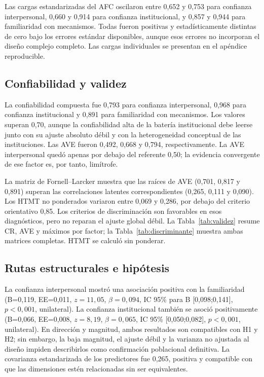 \documentclass[11pt,letterpaper]{article}
\begin{document}
Las cargas estandarizadas del AFC oscilaron entre 0{,}652 y 0{,}753 para confianza interpersonal, 0{,}660 y 0{,}914 para confianza institucional, y 0{,}857 y 0{,}944 para familiaridad con mecanismos. Todas fueron positivas y estadísticamente distintas de cero bajo los errores estándar disponibles, aunque esos errores no incorporan el diseño complejo completo. Las cargas individuales se presentan en el apéndice reproducible.

\subsection{Confiabilidad y validez}

La confiabilidad compuesta fue 0{,}793 para confianza interpersonal, 0{,}968 para confianza institucional y 0{,}891 para familiaridad con mecanismos. Los valores superan 0{,}70, aunque la confiabilidad alta de la batería institucional debe leerse junto con su ajuste absoluto débil y con la heterogeneidad conceptual de las instituciones. Las AVE fueron 0{,}492, 0{,}668 y 0{,}794, respectivamente. La AVE interpersonal quedó apenas por debajo del referente 0{,}50; la evidencia convergente de ese factor es, por tanto, limítrofe.

La matriz de Fornell--Larcker muestra que las raíces de AVE (0{,}701, 0{,}817 y 0{,}891) superan las correlaciones latentes correspondientes (0{,}265, 0{,}111 y 0{,}090). Los HTMT no ponderados variaron entre 0{,}069 y 0{,}286, por debajo del criterio orientativo 0{,}85. Los criterios de discriminación son favorables en esos diagnósticos, pero no reparan el ajuste global débil. La Tabla~\ref{tab:validez} resume CR, AVE y máximos por factor; la Tabla~\ref{tab:discriminante} muestra ambas matrices completas. HTMT se calculó sin ponderar.




\subsection{Rutas estructurales e hipótesis}

La confianza interpersonal mostró una asociación positiva con la familiaridad (B=0{,}119, EE=0{,}011, \(z=11{,}05\), \(\beta=0{,}094\), IC 95\% para B [0{,}098;0{,}141], \(p<0{,}001\), unilateral). La confianza institucional también se asoció positivamente (B=0{,}066, EE=0{,}008, \(z=8{,}19\), \(\beta=0{,}065\), IC 95\% [0{,}050;0{,}082], \(p<0{,}001\), unilateral). En dirección y magnitud, ambos resultados son compatibles con H1 y H2; sin embargo, la baja magnitud, el ajuste débil y la varianza no ajustada al diseño impiden describirlos como confirmación poblacional definitiva. La covarianza estandarizada de los predictores fue 0{,}265, positiva y compatible con que las dimensiones estén relacionadas sin ser equivalentes.
\end{document}

